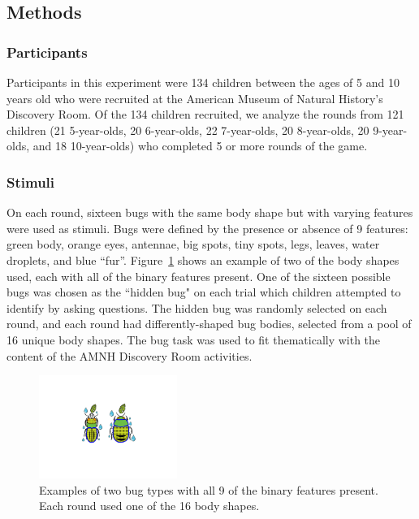 \documentclass[man,floatsintext]{apa6}
\begin{document}
\subsection{Methods}
\subsubsection{Participants}

Participants in this experiment were 134 children between the ages of 5 and 10 
years old who were recruited at the American Museum of Natural History's 
Discovery Room. Of the 134 children recruited, we analyze the rounds from 121 
children (21 5-year-olds, 20 6-year-olds, 22 7-year-olds, 20 8-year-olds, 20 9-year-olds, 
and 18 10-year-olds) who completed 5 or more rounds of the game.

\subsubsection{Stimuli}

On each round, sixteen bugs with the same body shape but with varying features were used as stimuli. Bugs were defined by the presence or absence of 9 features: green body, 
orange eyes, antennae, big spots, tiny spots, legs, leaves, water droplets, and blue 
``fur''. Figure~\ref{fig:example_bugs} shows an example of two of the body shapes used, each with all of the binary features present. One of the sixteen possible bugs was chosen as the ``hidden bug" on each trial which 
children attempted to identify by asking questions. The hidden bug was 
randomly selected on each round, and each round had differently-shaped bug 
bodies, selected from a pool of 16 unique body shapes.  The bug task was used to fit thematically with the content of the AMNH Discovery Room activities.


\begin{figure}[h]
  \centering
  \includegraphics[width=0.4\textwidth]{figures/example_bugs}
  \caption{Examples of two bug types with all 9 of the binary features present. Each round used one of the 16 
body shapes. } %
  \label{fig:example_bugs}
\end{figure} 
\end{document}
